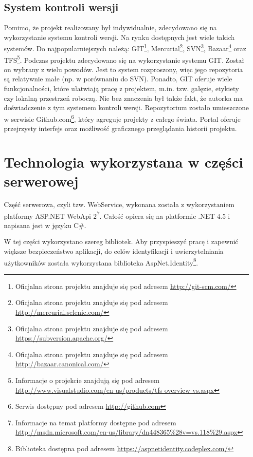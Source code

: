 \documentclass{book}
\begin{document}
			\subsection{System kontroli wersji}
			
			Pomimo, że projekt realizowany był indywidualnie, zdecydowano się na wykorzystanie systemu kontroli wersji. Na rynku dostępnych jest wiele takich systemów. Do najpopularniejszych należą: GIT\footnote{Oficjalna strona projektu znajduje się pod adresem \url{http://git-scm.com/}}, Mercurial\footnote{Oficjalna strona projektu znajduje się pod adresem \url{http://mercurial.selenic.com/}}, SVN\footnote{Oficjalna strona projektu znajduje się pod adresem \url{https://subversion.apache.org/}}, Bazaar\footnote{Oficjalna strona projektu znajduje się pod adresem \url{http://bazaar.canonical.com/}} oraz TFS\footnote{Informacje o projekcie znajdują się pod adresem \url{http://www.visualstudio.com/en-us/products/tfs-overview-vs.aspx}}. 
			Podczas projektu zdecydowano się na wykorzystanie systemu GIT. Został on wybrany z wielu powodów. Jest to system rozproszony, więc jego repozytoria są relatywnie małe (np. w porównaniu do SVN). Ponadto, GIT oferuje wiele funkcjonalności, które ułatwiają pracę z projektem, m.in. tzw. gałęzie, etykiety czy lokalną przestrzeń roboczą. Nie bez znaczenia był także fakt, że autorka ma doświadczenie z tym systemem kontroli wersji.
			Repozytorium zostało umieszczone w serwisie Github.com\footnote{Serwis dostępny pod adresem \url{http://github.com}}, który agreguje projekty z całego świata. Portal oferuje przejrzysty interfejs oraz możliwość graficznego przeglądania historii projektu.
		
		\section{Technologia wykorzystana w części serwerowej}
		
		Część serwerowa, czyli tzw. WebService, wykonana została z wykorzystaniem platformy ASP.NET WebApi 2\footnote{Informacje na temat platformy dostępne pod adresem \url{http://msdn.microsoft.com/en-us/library/dn448365\%28v=vs.118\%29.aspx}}. Całość opiera się na platformie .NET 4.5 i napisana jest w języku C\#.
		
		W tej części wykorzystano szereg bibliotek. Aby przyspieszyć pracę i zapewnić większe bezpieczeństwo aplikacji, do celów identyfikacji i uwierzytelniania użytkowników została wykorzystana biblioteka AspNet.Identity\footnote{Biblioteka dostępna pod adresem \url{https://aspnetidentity.codeplex.com/}}.
		
\end{document}
